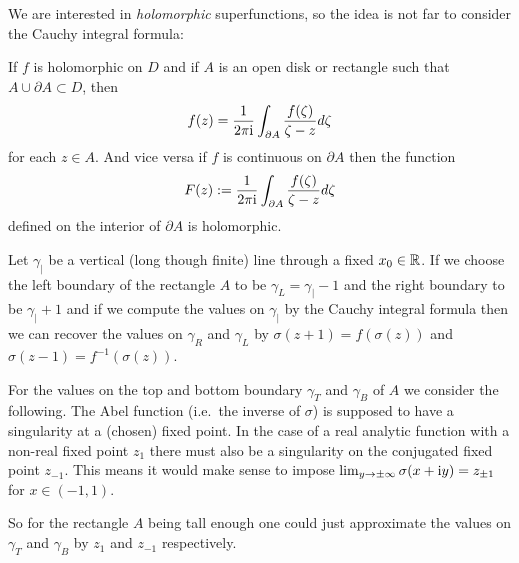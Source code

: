 We are interested in {\em holomorphic} superfunctions, so the idea is
not far to consider the Cauchy integral formula:
\begin{wellknown}\label{wk:cauchy_integral}
  If $f$ is holomorphic on $D$ and if $A$ is an open disk
  or rectangle such that $A\cup \partial A\subset D$, then 
  \begin{align}\label{eq:cif}
    f(z)=\frac{1}{2\pi \mathrm{i}}\int_{\partial A} \frac{f(\zeta)}{\zeta - z}
    d\zeta
  \end{align}
  for each $z\in A$. And vice versa if $f$ is continuous on $\partial
  A$ then the function
  \begin{align*}
    F(z):=\frac{1}{2\pi \mathrm{i}}\int_{\partial A} \frac{f(\zeta)}{\zeta-z} d\zeta
  \end{align*}
  defined on the interior of $\partial A$ is holomorphic.
\end{wellknown}
Let $\gamma_|$ be a vertical (long though finite) line through a fixed
$x_0\in\mathbb{R}$.
If we choose the left boundary of the rectangle $A$ to be
$\gamma_L=\gamma_|-1$ and the right boundary to be $\gamma_|+1$ and if
we compute the values on $\gamma_|$ by the Cauchy integral formula
then we can recover the values on $\gamma_R$ and $\gamma_L$ by
$\sigma(z+1)=f(\sigma(z))$ and $\sigma(z-1)=f^{-1}(\sigma(z))$.

For the values on the top and bottom boundary $\gamma_T$ and
$\gamma_B$ of $A$ we consider the following. The Abel function (i.e.\
the inverse of $\sigma$) is supposed to have a singularity at a
(chosen) fixed point. In the case of a real analytic function with a
non-real fixed point $z_1$ there must also be a singularity on the
conjugated fixed point $z_{-1}$. This means it would make sense to impose 
 $\lim_{y\to\pm\infty}\sigma(x+\mathrm{i} y)= z_{\pm 1}$ for $x\in (-1,1)$.

So for the rectangle $A$ being tall enough one could just approximate
the values on $\gamma_T$ and $\gamma_B$ by $z_1$ and $z_{-1}$
respectively.

